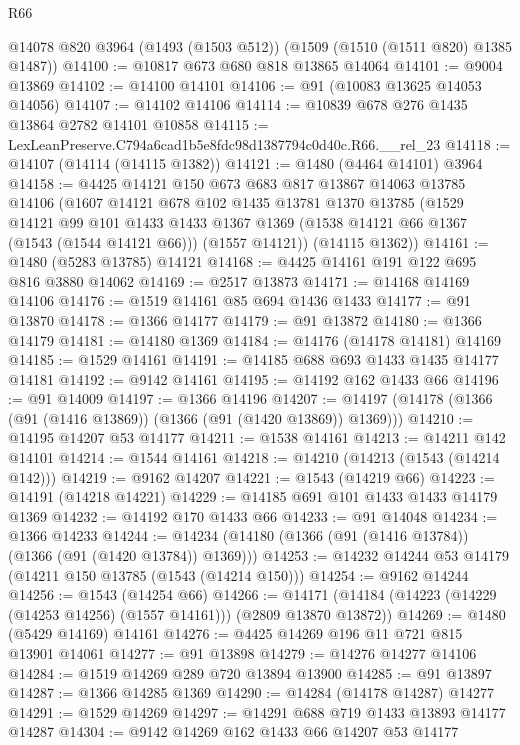 \begin{lexlean}{R66}
\begin{coremodule}
    @14078
    @820
    @3964
    (@1493 (@1503 @512))
    (@1509 (@1510 (@1511 @820) @1385 @1487))
@14100 := @10817 @673 @680 @818 @13865 @14064
@14101 := @9004 @13869
@14102 := @14100 @14101
@14106 := @91 (@10083 @13625 @14053 @14056)
@14107 := @14102 @14106
@14114 := @10839 @678 @276 @1435 @13864 @2782 @14101 @10858
@14115 := LexLeanPreserve.C794a6cad1b5e8fdc98d1387794c0d40c.R66.__rel_23
@14118 := @14107 (@14114 (@14115 @1382))
@14121 := @1480 (@4464 @14101) @3964
@14158 := @4425
    @14121
    @150
    @673
    @683
    @817
    @13867
    @14063
    @13785
    @14106
    (@1607
      @14121
      @678
      @102
      @1435
      @13781
      @1370
      @13785
      (@1529
        @14121
        @99
        @101
        @1433
        @1433
        @1367
        @1369
        (@1538 @14121 @66 @1367 (@1543 (@1544 @14121 @66)))
        (@1557 @14121))
      (@14115 @1362))
@14161 := @1480 (@5283 @13785) @14121
@14168 := @4425 @14161 @191 @122 @695 @816 @3880 @14062
@14169 := @2517 @13873
@14171 := @14168 @14169 @14106
@14176 := @1519 @14161 @85 @694 @1436 @1433
@14177 := @91 @13870
@14178 := @1366 @14177
@14179 := @91 @13872
@14180 := @1366 @14179
@14181 := @14180 @1369
@14184 := @14176 (@14178 @14181) @14169
@14185 := @1529 @14161
@14191 := @14185 @688 @693 @1433 @1435 @14177 @14181
@14192 := @9142 @14161
@14195 := @14192 @162 @1433 @66
@14196 := @91 @14009
@14197 := @1366 @14196
@14207 := @14197 (@14178 (@1366 (@91 (@1416 @13869)) (@1366 (@91 (@1420 @13869)) @1369)))
@14210 := @14195 @14207 @53 @14177
@14211 := @1538 @14161
@14213 := @14211 @142 @14101
@14214 := @1544 @14161
@14218 := @14210 (@14213 (@1543 (@14214 @142)))
@14219 := @9162 @14207
@14221 := @1543 (@14219 @66)
@14223 := @14191 (@14218 @14221)
@14229 := @14185 @691 @101 @1433 @1433 @14179 @1369
@14232 := @14192 @170 @1433 @66
@14233 := @91 @14048
@14234 := @1366 @14233
@14244 := @14234 (@14180 (@1366 (@91 (@1416 @13784)) (@1366 (@91 (@1420 @13784)) @1369)))
@14253 := @14232 @14244 @53 @14179 (@14211 @150 @13785 (@1543 (@14214 @150)))
@14254 := @9162 @14244
@14256 := @1543 (@14254 @66)
@14266 := @14171 (@14184 (@14223 (@14229 (@14253 @14256) (@1557 @14161))) (@2809 @13870 @13872))
@14269 := @1480 (@5429 @14169) @14161
@14276 := @4425 @14269 @196 @11 @721 @815 @13901 @14061
@14277 := @91 @13898
@14279 := @14276 @14277 @14106
@14284 := @1519 @14269 @289 @720 @13894 @13900
@14285 := @91 @13897
@14287 := @1366 @14285 @1369
@14290 := @14284 (@14178 @14287) @14277
@14291 := @1529 @14269
@14297 := @14291 @688 @719 @1433 @13893 @14177 @14287
@14304 := @9142 @14269 @162 @1433 @66 @14207 @53 @14177

\end{coremodule}
\end{lexlean}
